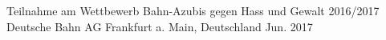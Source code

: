 \begin{cventries}
    
  \cventry
    {Teilnahme am Wettbewerb {\glqq}Bahn-Azubis gegen Hass und Gewalt{\grqq} 2016/2017} %
    {Deutsche Bahn AG} %
    {Frankfurt a. Main, Deutschland} %
    {Jun. 2017} %
    {
    }
    \vspace{-4.0mm}


\end{cventries}

